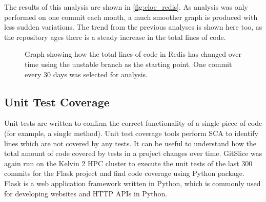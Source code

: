The results of this analysis are shown in \autoref{fig:cloc_redis}.
As analysis was only performed on one commit each month, a much smoother graph is produced with less sudden variations.
The trend from the previous analyses is shown here too, as the repository ages there is a steady increase in the total lines of code.

\begin{figure}
    \centering
    \caption{Graph showing how the total lines of code in Redis has changed over time using the unstable branch as the starting point.  One commit every 30 days was selected for analysis.}
    \label{fig:cloc_redis}
\end{figure}

\subsection{Unit Test Coverage}
\label{subsec:unit-tests}

Unit tests are written to confirm the correct functionality of a single piece of code (for example, a single method).
Unit test coverage tools perform SCA to identify lines which are not covered by any tests.
It can be useful to understand how the total amount of code covered by tests in a project changes over time.
GitSlice was again run on the Kelvin 2 HPC cluster to execute the unit tests of the last $ 300 $ commits for the Flask project and find code coverage using Python  package.
Flask is a web application framework written in Python, which is commonly used for developing websites and HTTP APIs in Python.

